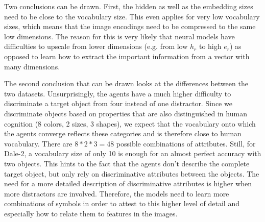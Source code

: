 Two conclusions can be drawn.
First, the hidden as well as the embedding sizes need to be close to the vocabulary size.
This even applies for very low vocabulary sizes, which means that the image encodings need to be compressed to the same low dimensions.
The reason for this is very likely that neural models have difficulties to upscale from lower dimensions (e.g. from low $h_r$ to high $e_r$) as opposed to learn how to extract the important information from a vector with many dimensions.

The second conclusion that can be drawn looks at the differences between the two datasets.
Unsurprisingly, the agents have a much higher difficulty to discriminate a target object from four instead of one distractor.
Since we discriminate objects based on properties that are also distinguished in human cognition (8 colors, 2 sizes, 3 shapes), we expect that the vocabulary onto which the agents converge reflects these categories and is therefore close to human vocabulary.
There are $8*2*3=48$ possible combinations of attributes.
Still, for Dale-2, a vocabulary size of only 10 is enough for an almost perfect accuracy with two objects.
This hints to the fact that the agents don't describe the complete target object, but only rely on discriminative attributes between the objects.
The need for a more detailed description of discriminative attributes is higher when more distractors are involved.
Therefore, the models need to learn more combinations of symbols in order to attest to this higher level of detail and especially how to relate them to features in the images.

